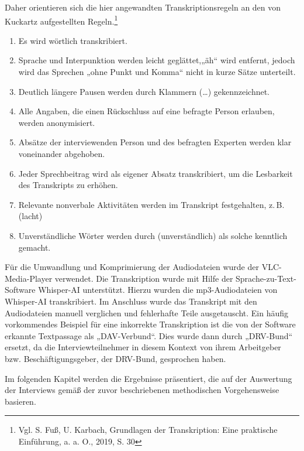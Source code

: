 Daher orientieren sich die hier angewandten Transkriptionsregeln an den von Kuckartz aufgestellten Regeln.\footnote{Vgl. S. Fuß, U. Karbach, Grundlagen der Transkription: Eine praktische Einführung, a. a. O., 2019, S. 30 } 

\begin{enumerate}
    \item Es wird wörtlich transkribiert.
    \item Sprache und Interpunktion werden leicht geglättet,„äh“ wird entfernt, jedoch wird das Sprechen „ohne Punkt und Komma“ nicht in kurze Sätze unterteilt.
    \item Deutlich längere Pausen werden durch Klammern (\dots) gekennzeichnet.
    \item Alle Angaben, die einen Rückschluss auf eine befragte Person erlauben, werden anonymisiert.
    \item Absätze der interviewenden Person und des befragten Experten werden klar voneinander abgehoben.
    \item Jeder Sprechbeitrag wird als eigener Absatz transkribiert, um die Lesbarkeit des Transkripts zu erhöhen.
    \item Relevante nonverbale Aktivitäten werden im Transkript festgehalten, z.\,B. (lacht)
    \item Unverständliche Wörter werden durch (unverständlich) als solche kenntlich gemacht.
\end{enumerate}

Für die Umwandlung und Komprimierung der Audiodateien wurde der VLC-Media-Player verwendet. Die Transkription wurde mit Hilfe der Sprache-zu-Text-Software Whisper-AI unterstützt. Hierzu wurden die mp3-Audiodateien von Whisper-AI transkribiert. Im Anschluss wurde das Transkript mit den Audiodateien manuell verglichen und fehlerhafte Teile ausgetauscht. Ein häufig vorkommendes Beispiel für eine inkorrekte Transkription ist die von der Software erkannte Textpassage als „DAV-Verbund“. Dies wurde dann durch „DRV-Bund“ ersetzt, da die Interviewteilnehmer in diesem Kontext von ihrem Arbeitgeber bzw. Beschäftigungsgeber, der DRV-Bund, gesprochen haben. 

Im folgenden Kapitel werden die Ergebnisse präsentiert, die auf der Auswertung der Interviews gemäß der zuvor beschriebenen methodischen Vorgehensweise basieren.